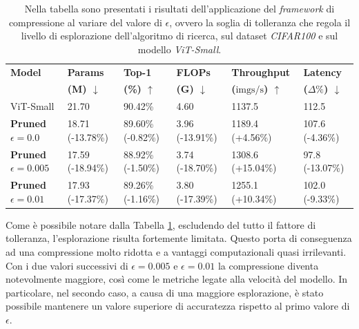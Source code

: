 \begin{table}[H]
    \centering
    \footnotesize
    \setlength{\tabcolsep}{4pt}
    \begin{tabular}{@{} l l l l l l @{}}
        \toprule
        \textbf{Model} & \textbf{Params} & \textbf{Top-1} & \textbf{FLOPs} & \textbf{Throughput} & \textbf{Latency} \\ 
                       & \textbf{(M) $\downarrow$}    & \textbf{(\%) $\uparrow$}  & \textbf{(G) $\downarrow$}   & \textbf{($\text{imgs}/\text{s}$) $\uparrow$} & \textbf{($\Delta\%$) $\downarrow$} \\ 
        \midrule
        ViT-Small                           & 21.70 \hphantom{(-00.00\%)}                 & 90.42\% \hphantom{(-0.00\%)}                 & 4.60 \hphantom{(-00.00\%)}          & 1137.5 \hphantom{(+00.00\%)}            & 112.5 \hphantom{(-00.00\%)}          \\
        \midrule
        \textbf{Pruned $\epsilon = 0.0$}    & 18.71 (-13.78\%)                            & 89.60\% (-0.82\%)                            & 3.96 (-13.91\%)                     & 1189.4 (+4.56\%)                        & 107.6 (-4.36\%)                      \\
        \midrule
        \textbf{Pruned $\epsilon = 0.005$}  & 17.59 (-18.94\%)                            & 88.92\% (-1.50\%)                            & 3.74 (-18.70\%)                     & 1308.6 (+15.04\%)                       & 97.8 (-13.07\%)                      \\
        \midrule
        \textbf{Pruned $\epsilon = 0.01$}   & 17.93 (-17.37\%)                            & 89.26\% (-1.16\%)                            & 3.80 (-17.39\%)                     & 1255.1 (+10.34\%)                       & 102.0 (-9.33\%)                      \\
        \bottomrule
    \end{tabular}
    \vspace{10pt}
    \caption{Nella tabella sono presentati i risultati dell'applicazione del \textit{framework} di compressione al variare del valore di $\epsilon$, ovvero la soglia di tolleranza che regola il livello di esplorazione dell'algoritmo di ricerca, sul dataset \textit{CIFAR100} e sul modello \textit{ViT-Small}.}
    \label{tab:risultati-eps}
\end{table}

Come è possibile notare dalla Tabella \ref{tab:risultati-eps}, escludendo del tutto il fattore di tolleranza, l'esplorazione risulta fortemente limitata. Questo porta di conseguenza ad una compressione molto ridotta e a vantaggi computazionali quasi irrilevanti. Con i due valori successivi di $\epsilon=0.005$ e $\epsilon=0.01$ la compressione diventa notevolmente maggiore, così come le metriche legate alla velocità del modello. In particolare, nel secondo caso, a causa di una maggiore esplorazione, è stato possibile mantenere un valore superiore di accuratezza rispetto al primo valore di $\epsilon$. 


